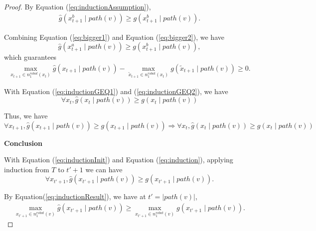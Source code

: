 \documentclass[12pt]{article}
\begin{document}
\begin{lem}
\begin{proof}
By Equation (\ref{eq:inductionAssumption}),
\begin{equation}
\label{eq:bigger2}
\begin{aligned}
\hat{g}(x^{b}_{t+1} \mid path(v)) \geq g(x^{b}_{t+1} \mid path(v)).
\end{aligned}
\end{equation}

Combining Equation (\ref{eq:bigger1}) and Equation (\ref{eq:bigger2}), we have 
\begin{equation}
 \hat{g} ( x^{a}_{t+1} \mid path(v) ) \geq  g ( x^{b}_{t+1} \mid path(v) ),
\end{equation} 
 which guarantees
\begin{equation}
\label{eq:inductionGEQ2}
\begin{aligned}
\max_{x_{t+1} \in n^{robot}_{1}(x_{t})} \hat{g}(x_{t+1} \mid path(v)) - \max_{\tilde{x}_{t+1} \in n^{robot}_{1}(x_{t})} g(\tilde{x}_{t+1} \mid path(v)) \geq 0.
\end{aligned}
\end{equation}

With Equation (\ref{eq:inductionGEQ1}) and (\ref{eq:inductionGEQ2}), we have
\begin{equation}
\label{eq:inductConclusion}
\forall x_{t}, \hat{g}(x_{t} \mid path(v)) \geq g(x_{t} \mid path(v))
\end{equation}

Thus, we have
\begin{equation}
\label{eq:induction}
\forall x_{t+1}, \hat{g}(x_{t+1} \mid path(v)) \geq g(x_{t+1} \mid path(v)) \Rightarrow  \forall x_{t}, \hat{g}(x_{t} \mid path(v)) \geq g(x_{t} \mid path(v))
\end{equation}

\textbf{Conclusion}

With Equation (\ref{eq:inductionInit}) and Equation (\ref{eq:induction}), applying induction from $ T $ to $ t'+1 $  we can have
\begin{equation}
\label{eq:inductionResult}
\forall x_{t'+1}, \hat{g}(x_{t'+1} \mid path(v)) \geq g(x_{t'+1} \mid path(v)).
\end{equation}

By Equation(\ref{eq:inductionResult}), we have at $ t' = \left| path(v) \right| $, 
\begin{equation}
\label{eq:inductEnd}
\begin{aligned}
\max_{x_{t'+1} \in n^{robot}_{1}(v)} \hat{g}(x_{t'+1} \mid path(v)) \geq \max_{x_{t'+1} \in n^{robot}_{1}(v)} g(x_{t'+1} \mid path(v)).
\end{aligned}
\end{equation}


\end{proof}
\end{lem}
\end{document}
